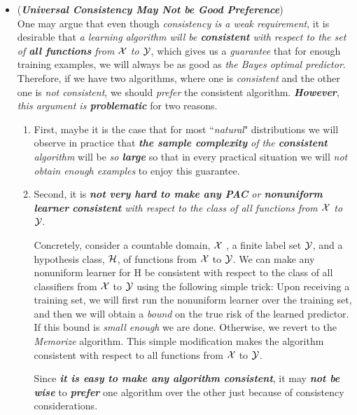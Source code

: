\documentclass[11pt]{article}
\begin{document}
\begin{itemize}
\item \begin{remark} (\emph{\textbf{Universal Consistency May Not be Good Preference}}) \citep{shalev2014understanding}\\
One may argue that even though \emph{consistency is a weak requirement}, it is desirable that \emph{a learning algorithm will be \textbf{consistent} with respect to the set of \textbf{all functions} from ${\mathcal X}$ to ${\mathcal Y}$}, which gives us a \emph{guarantee} that for enough training examples, we will always be as good as \emph{the Bayes optimal predictor}. Therefore, if we have two algorithms, where one is \emph{consistent} and the other one is \emph{not consistent}, we should \emph{prefer} the consistent algorithm. \emph{\textbf{However}}, \emph{this argument is \textbf{problematic}} for two reasons.
\begin{enumerate}
\item First, maybe it is the case that for most ``\emph{natural}" distributions we will observe in practice that \emph{\textbf{the sample complexity} of the \textbf{consistent} algorithm} will be \emph{so \textbf{large}} so that in every practical situation we will \emph{not obtain enough examples} to enjoy this guarantee. 

\item Second, it is \emph{\textbf{not very hard to make any PAC} or \textbf{nonuniform learner} \textbf{consistent} with respect to the class of all functions from ${\mathcal X}$ to ${\mathcal Y}$}. 

Concretely, consider a countable domain, ${\mathcal X}$ , a finite label set ${\mathcal Y}$, and a hypothesis class, ${\mathcal H}$, of functions from ${\mathcal X}$ to ${\mathcal Y}$. We can make any nonuniform learner for H be consistent with respect to the class of all classifiers from ${\mathcal X}$ to ${\mathcal Y}$ using the following simple trick: Upon receiving a training set, we will first run the nonuniform learner over the training set, and then we will obtain a \emph{bound} on the true risk of the learned predictor. If this bound is \emph{small enough} we are done. Otherwise, we revert to the \emph{Memorize} algorithm. This simple modification makes the algorithm consistent with respect to all functions from ${\mathcal X}$ to ${\mathcal Y}$. 

Since \emph{\textbf{it is easy to make any algorithm consistent}}, it may \emph{\textbf{not be wise}} to \emph{\textbf{prefer}} one algorithm over the other just because of consistency considerations.
\end{enumerate}
\end{remark}
\end{itemize}
\newpage


\end{document}
